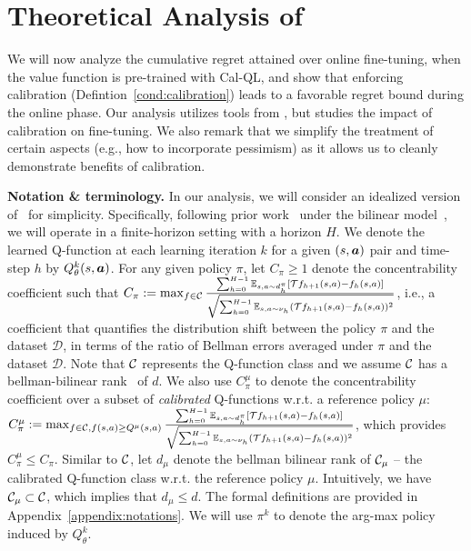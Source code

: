 \vspace{-0.15cm}
\section{Theoretical Analysis of \methodname}
\label{sec:theory}
\vspace{-0.25cm}

We will now analyze the cumulative regret attained over online fine-tuning, when the value function is pre-trained with Cal-QL, and show that enforcing calibration (Defintion~\ref{cond:calibration}) leads to a favorable regret bound during the online phase. Our analysis utilizes tools from \citet{song2023hybrid}, but studies the impact of calibration on fine-tuning. We also remark that we simplify the treatment of certain aspects (e.g., how to incorporate pessimism) as it allows us to cleanly demonstrate benefits of calibration.  

{\textbf{Notation \& terminology.}} In our analysis, we will consider an idealized version of \methodname\ for simplicity. Specifically, following prior work~\citep{song2023hybrid} under the bilinear model~\citep{du2021bilinear}, we will operate in a finite-horizon setting with a horizon $H$. We denote the learned Q-function at each learning iteration $k$ for a given $(s, \boldsymbol{a})$ pair and time-step $h$ by $Q_{\theta}^k(s, \boldsymbol{a})$. For any given policy $\pi$, let $C_\pi\geq1$ denote the concentrability coefficient such that $C_\pi:=\max_{f\in \mathcal C}\frac{\sum_{h=0}^{H-1}\mathbb E_{s,a\sim d_h^\pi}[\mathcal T f_{h+1}(s,a)-f_h(s,a)]}{\sqrt{\sum_{h=0}^{H-1}\mathbb E_{s,a\sim \nu_h}(\mathcal T f_{h+1}(s,a)-f_h(s,a))^2}}$,
i.e., a coefficient that quantifies the distribution shift between the policy $\pi$ and the dataset $\mathcal{D}$, in terms of the ratio of Bellman errors averaged under $\pi$ and the dataset $\mathcal{D}$. Note that $\mathcal C$ represents the Q-function class and we assume $\mathcal C$ has a bellman-bilinear rank~\citep{du2021bilinear} of $d$. We also use $C_\pi^\mu$ to denote the concentrability coefficient over a subset of {\em calibrated} Q-functions w.r.t. a reference policy $\mu$: $C^\mu_\pi:=\max_{f\in \mathcal C,f(s,a)\geq Q^\mu(s,a)}\frac{\sum_{h=0}^{H-1}\mathbb E_{s,a\sim d_h^\pi}[\mathcal T f_{h+1}(s,a)-f_h(s,a)]}{\sqrt{\sum_{h=0}^{H-1}\mathbb E_{s,a\sim \nu_h}(\mathcal T f_{h+1}(s,a)-f_h(s,a))^2}}$, which provides $C^\mu_\pi\leq C_\pi$. Similar to $\mathcal C$, let $d_\mu$ denote the bellman bilinear rank of $\mathcal C_\mu$ -- 
the calibrated Q-function class w.r.t. the reference policy $\mu$.
Intuitively, we have $\mathcal C_\mu\subset\mathcal C$, which implies that $d_\mu\leq d$. The formal definitions are provided in Appendix~\ref{appendix:notations}.
We will use $\pi^k$ to denote the arg-max policy induced by $Q^k_\theta$. 

